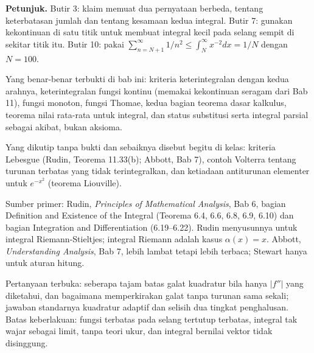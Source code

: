 \begin{latihan}
\noindent\textbf{Petunjuk.} Butir 3: klaim memuat dua pernyataan berbeda, tentang
keterbatasan jumlah dan tentang kesamaan kedua integral. Butir 7: gunakan
kekontinuan di satu titik untuk membuat integral kecil pada selang sempit di sekitar
titik itu. Butir 10: pakai $\sum_{n=N+1}^\infty1/n^2\le\int_N^\infty x^{-2}dx=1/N$
dengan $N=100$.
\end{latihan}

\begin{untukpeneliti}
Yang benar-benar terbukti di bab ini: kriteria keterintegralan dengan kedua arahnya,
keterintegralan fungsi kontinu (memakai kekontinuan seragam dari Bab 11), fungsi
monoton, fungsi Thomae, kedua bagian teorema dasar kalkulus, teorema nilai rata-rata
untuk integral, dan status substitusi serta integral parsial sebagai akibat, bukan
aksioma.

Yang dikutip tanpa bukti dan sebaiknya disebut begitu di kelas: kriteria Lebesgue
(Rudin, Teorema 11.33(b); Abbott, Bab 7), contoh Volterra tentang turunan terbatas yang
tidak terintegralkan, dan ketiadaan antiturunan elementer untuk $e^{-x^2}$ (teorema
Liouville).

Sumber primer: Rudin, \emph{Principles of Mathematical Analysis}, Bab 6, bagian
Definition and Existence of the Integral (Teorema 6.4, 6.6, 6.8, 6.9, 6.10) dan bagian
Integration and Differentiation (6.19--6.22). Rudin menyusunnya untuk integral
Riemann-Stieltjes; integral Riemann adalah kasus $\alpha(x)=x$. Abbott,
\emph{Understanding Analysis}, Bab 7, lebih lambat tetapi lebih terbaca; Stewart hanya
untuk aturan hitung.

Pertanyaan terbuka: seberapa tajam batas galat kuadratur bila hanya $|f''|$ yang
diketahui, dan bagaimana memperkirakan galat tanpa turunan sama sekali; jawaban
standarnya kuadratur adaptif dan selisih dua tingkat penghalusan. Batas keberlakuan:
fungsi terbatas pada selang tertutup terbatas, integral tak wajar sebagai limit, tanpa
teori ukur, dan integral bernilai vektor tidak disinggung.
\end{untukpeneliti}

